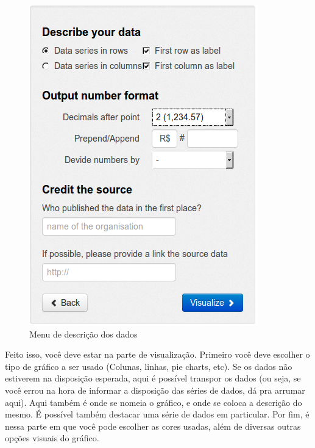 \documentclass[12pt,onecolumn]{article}
\begin{document}
    
    \begin{figure}[H]
      \begin{center}
        \includegraphics[scale = 0.5]{datawrapper-describe.png}
        \caption{Menu de descrição dos dados}
        \label{fig:datawrapper-describe}
      \end{center}
    \end{figure}
    
    Feito isso, você deve estar na parte de visualização. Primeiro você deve escolher
    o tipo de gráfico a ser usado (Colunas, linhas, pie charts, etc). Se os dados não
    estiverem na disposição esperada, aqui é possível transpor os dados (ou seja, se
    você errou na hora de informar a disposição das séries de dados, dá pra arrumar 
    aqui). Aqui também é onde se nomeia o gráfico, e onde se coloca a descrição do
    mesmo. É possível também destacar uma série de dados em particular. Por fim, 
    é nessa parte em que você pode escolher as cores usadas, além de diversas outras
    opções visuais do gráfico.
    
\end{document}
